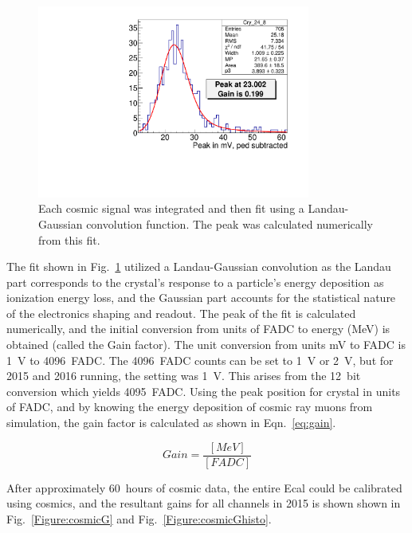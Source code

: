 \documentclass[12pt]{report}
\begin{document}
\begin{figure}[H]
  \centering
      \includegraphics[width=0.8\textwidth]{pics/performance/cosmicFitExample2015.pdf}
  \caption[Integrated cosmic signal in Ecal fitted for calibration]{Each cosmic signal was integrated and then fit using a Landau-Gaussian convolution function. The peak was calculated numerically from this fit.}
  \label{Figure:cosmicFit}
\end{figure}

The fit shown in Fig.~\ref{Figure:cosmicFit} utilized a Landau-Gaussian convolution as the Landau part corresponds to the crystal's response to a particle's energy deposition as ionization energy loss, and the Gaussian part accounts for the statistical nature of the electronics shaping and readout. The peak of the fit is calculated numerically, and the initial conversion from units of FADC to energy (MeV) is obtained (called the Gain factor). The unit conversion from units mV to FADC is 1~V to 4096~FADC. The 4096~FADC counts can be set to 1~V or 2~V, but for 2015 and 2016 running, the setting was 1~V. This arises from the 12~bit conversion which yields 4095~FADC. Using the peak position for crystal in units of FADC, and by knowing the energy deposition of cosmic ray muons from simulation, the gain factor is calculated as shown in Eqn.~\eqref{eq:gain}.

\begin{equation}
	\label{eq:gain}
	Gain = \dfrac{[MeV]}{[FADC]} 
\end{equation}

After approximately 60~hours of cosmic data, the entire Ecal could be calibrated using cosmics, and the resultant gains for all channels in 2015 is shown shown in Fig.~\ref{Figure:cosmicG} and Fig.~\ref{Figure:cosmicGhisto}.
\end{document}
